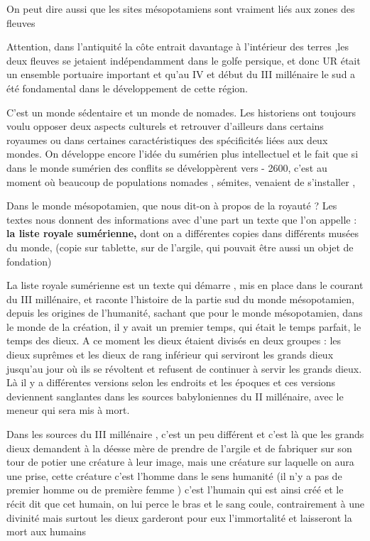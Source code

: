 \documentclass[a4paper,10pt]{article}
\begin{document}
\begin{itemize}
On peut dire aussi que les sites mésopotamiens sont vraiment liés aux
zones des fleuves

Attention, dans l'antiquité la côte entrait davantage à
l'intérieur des terres ,les deux fleuves se jetaient
indépendamment dans le golfe persique,  et donc UR était un ensemble
portuaire important et qu'au IV et début du III
millénaire le sud a été fondamental dans le développement de cette
région. 

C'est un monde sédentaire et un monde de nomades. Les
historiens ont toujours voulu opposer deux aspects culturels et
retrouver d'ailleurs dans certains royaumes ou dans
certaines caractéristiques des spécificités liées aux deux mondes. On
développe encore l'idée du sumérien plus intellectuel
et le fait que si dans le monde sumérien des conflits se développèrent
vers - 2600, c'est au moment où beaucoup de
populations nomades , sémites, venaient de s'installer
, 

Dans le monde mésopotamien, que nous dit-on  à propos de la royauté ?
Les textes nous donnent des informations avec d'une
part un texte que l'on appelle : \textbf{la liste
royale sumérienne, }dont on a différentes copies dans différents musées
du monde, (copie sur tablette, sur de l'argile, qui
pouvait être aussi un objet de fondation)

La liste royale sumérienne est un texte qui démarre , mis en place dans
le courant du III millénaire, et raconte l'histoire de
la partie sud du monde mésopotamien, depuis les origines de
l'humanité, sachant que pour le monde mésopotamien,
dans le monde de la création, il y avait un premier temps, qui était le
temps parfait, le temps des dieux. A ce moment les dieux étaient
divisés en deux groupes : les dieux suprêmes et les dieux de rang
inférieur qui serviront les grands dieux jusqu'au jour
où ils se révoltent et refusent de continuer à servir les grands dieux.
Là il y a différentes versions selon les endroits et les époques et ces
versions deviennent sanglantes dans les sources babyloniennes du II
millénaire, avec le meneur qui sera mis à mort.

Dans les sources du III millénaire , c'est un peu
différent et c'est là que les grands dieux demandent à
la déesse mère de prendre de l'argile et de fabriquer
sur son tour de potier une créature à leur image, mais une créature sur
laquelle on aura une prise, cette créature c'est
l'homme dans le sens humanité (il n'y
a pas de premier homme ou de première femme ) c'est
l'humain qui est ainsi créé et le récit dit que cet
humain, on lui perce le bras et le sang coule, contrairement à une
divinité mais surtout les dieux garderont pour eux
l'immortalité et laisseront la mort aux humains


\end{itemize}
\end{document}
